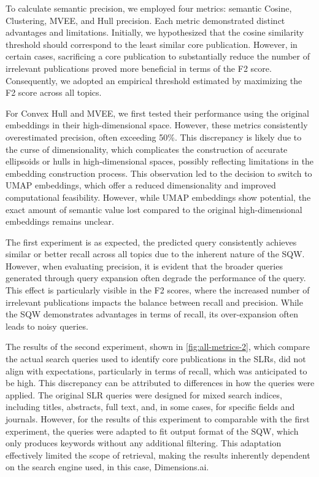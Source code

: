 To calculate semantic precision, we employed four metrics: semantic Cosine, Clustering, MVEE, and Hull precision. Each metric demonstrated distinct advantages and limitations. Initially, we hypothesized that the cosine similarity threshold should correspond to the least similar core publication. However, in certain cases, sacrificing a core publication to substantially reduce the number of irrelevant publications proved more beneficial in terms of the F2 score. Consequently, we adopted an empirical threshold estimated by maximizing the F2 score across all topics.

For Convex Hull and MVEE, we first tested their performance using the original embeddings in their high-dimensional space. However, these metrics consistently overestimated precision, often exceeding 50\%. This discrepancy is likely due to the curse of dimensionality, which complicates the construction of accurate ellipsoids or hulls in high-dimensional spaces, possibly reflecting limitations in the embedding construction process. This observation led to the decision to switch to UMAP embeddings, which offer a reduced dimensionality and improved computational feasibility. However, while UMAP embeddings show potential, the exact amount of semantic value lost compared to the original high-dimensional embeddings remains unclear.

The first experiment is as expected, the predicted query consistently achieves similar or better recall across all topics due to the inherent nature of the SQW. However, when evaluating precision, it is evident that the broader queries generated through query expansion often degrade the performance of the query. This effect is particularly visible in the F2 scores, where the increased number of irrelevant publications impacts the balance between recall and precision. While the SQW demonstrates advantages in terms of recall, its over-expansion often leads to noisy queries.

The results of the second experiment, shown in \autoref{fig:all-metrics-2}, which compare the actual search queries used to identify core publications in the SLRs, did not align with expectations, particularly in terms of recall, which was anticipated to be high. This discrepancy can be attributed to differences in how the queries were applied. The original SLR queries were designed for mixed search indices, including titles, abstracts, full text, and, in some cases, for specific fields and journals. However, for the results of this experiment to comparable with the first experiment, the queries were adapted to fit output format of the SQW, which only produces keywords without any additional filtering. This adaptation effectively limited the scope of retrieval, making the results inherently dependent on the search engine used, in this case, Dimensions.ai.

